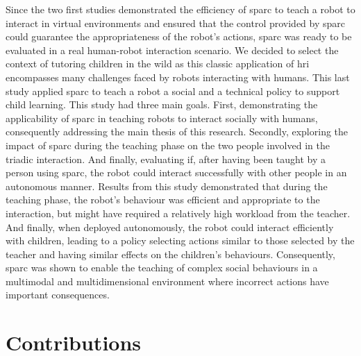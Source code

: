 Since the two first studies demonstrated the efficiency of \gls{sparc} to teach a robot to interact in virtual environments and ensured that the control provided by \gls{sparc} could guarantee the appropriateness of the robot's actions, \gls{sparc} was ready to be evaluated in a real human-robot interaction scenario. We decided to select the context of tutoring children in the wild as this classic application of \gls{hri} encompasses many challenges faced by robots interacting with humans. This last study applied \gls{sparc} to teach a robot a social and a technical policy to support child learning. This study had three main goals. First, demonstrating the applicability of \gls{sparc} in teaching robots to interact socially with humans, consequently addressing the main thesis of this research. Secondly, exploring the impact of \gls{sparc} during the teaching phase on the two people involved in the triadic interaction. And finally, evaluating if, after having been taught by a person using \gls{sparc}, the robot could interact successfully with other people in an autonomous manner. Results from this study demonstrated that during the teaching phase, the robot's behaviour was efficient and appropriate to the interaction, but might have required a relatively high workload from the teacher. And finally, when deployed autonomously, the robot could interact efficiently with children, leading to a policy selecting actions similar to those selected by the teacher and having similar effects on the children's behaviours. Consequently, \gls{sparc} was shown to enable the teaching of complex social behaviours in a multimodal and multidimensional environment where incorrect actions have important consequences.

\section{Contributions}\label{sec:conc_contribution}

